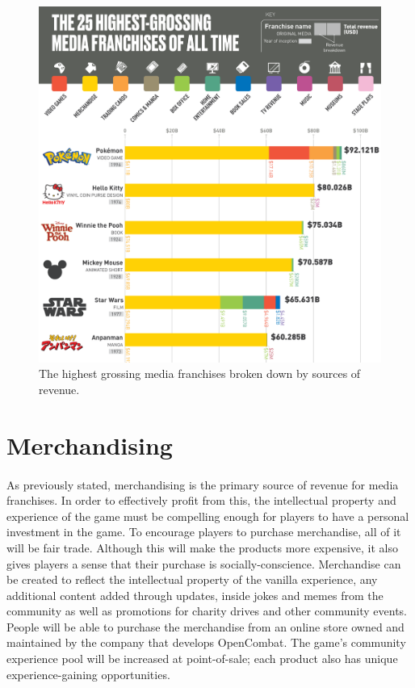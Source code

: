\begin{figure}[h!]
    \centering
    \includegraphics[width=1\linewidth]{images/highest-grossing-media-franchises-all-time.png}
    \caption{The highest grossing media franchises broken down by sources of revenue.\nocite{titlemax_top_nodate}}
\end{figure}

\pagebreak

\section{Merchandising}

\paragraph{} As previously stated, merchandising is the primary source of revenue for media franchises. In order to effectively profit from this, the intellectual property and experience of the game must be compelling enough for players to have a personal investment in the game. To encourage players to purchase merchandise, all of it will be fair trade. Although this will make the products more expensive, it also gives players a sense that their purchase is socially-conscience. Merchandise can be created to reflect the intellectual property of the vanilla experience, any additional content added through updates, inside jokes and memes from the community as well as promotions for charity drives and other community events. People will be able to purchase the merchandise from an online store owned and maintained by the company that develops OpenCombat. The game's community experience pool will be increased at point-of-sale; each product also has unique experience-gaining opportunities. 

